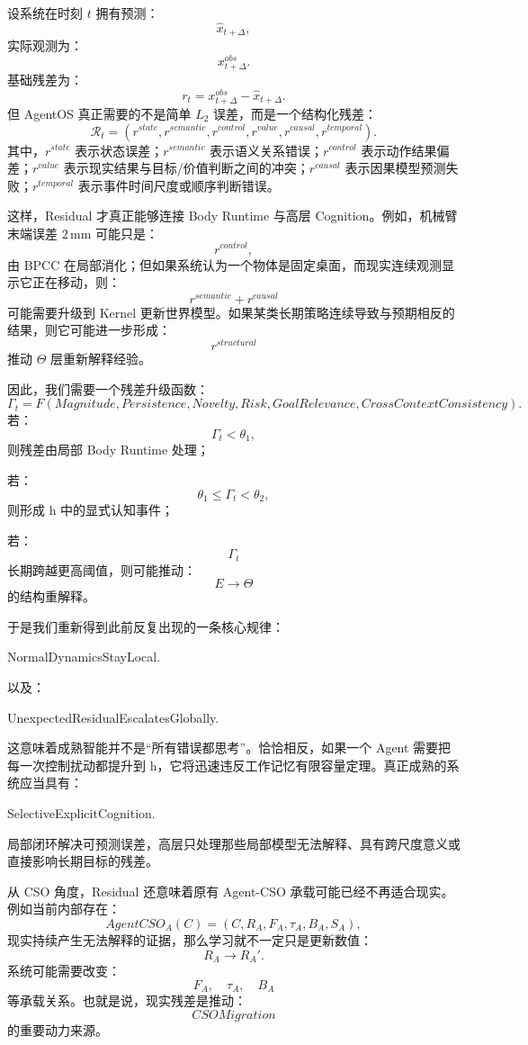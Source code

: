 设系统在时刻 $t$ 拥有预测：
\[
\hat{x}_{t+\Delta},
\]
实际观测为：
\[
x^{obs}_{t+\Delta}.
\]
基础残差为：
\[
r_t
=
x^{obs}_{t+\Delta}
-
\hat{x}_{t+\Delta}.
\]
但 AgentOS 真正需要的不是简单 $L_2$ 误差，而是一个结构化残差：
\[
\boxed{
\mathcal R_t
=
(
r^{state},
r^{semantic},
r^{control},
r^{value},
r^{causal},
r^{temporal}
).
}
\]
其中，$r^{state}$ 表示状态误差；$r^{semantic}$ 表示语义关系错误；$r^{control}$ 表示动作结果偏差；$r^{value}$ 表示现实结果与目标/价值判断之间的冲突；$r^{causal}$ 表示因果模型预测失败；$r^{temporal}$ 表示事件时间尺度或顺序判断错误。

这样，Residual 才真正能够连接 Body Runtime 与高层 Cognition。例如，机械臂末端误差 $2\,\mathrm{mm}$ 可能只是：
\[
r^{control},
\]
由 BPCC 在局部消化；但如果系统认为一个物体是固定桌面，而现实连续观测显示它正在移动，则：
\[
r^{semantic}+r^{causal}
\]
可能需要升级到 Kernel 更新世界模型。如果某类长期策略连续导致与预期相反的结果，则它可能进一步形成：
\[
r^{structural}
\]
推动 $\Theta$ 层重新解释经验。

因此，我们需要一个残差升级函数：
\[
\Gamma_t
=
F
\left(
Magnitude,
Persistence,
Novelty,
Risk,
GoalRelevance,
CrossContextConsistency
\right).
\]
若：
\[
\Gamma_t<\theta_1,
\]
则残差由局部 Body Runtime 处理；

若：
\[
\theta_1\leq\Gamma_t<\theta_2,
\]
则形成 h 中的显式认知事件；

若：
\[
\Gamma_t
\]
长期跨越更高阈值，则可能推动：
\[
E\rightarrow\Theta
\]
的结构重解释。

于是我们重新得到此前反复出现的一条核心规律：
\begin{statementbox}
NormalDynamicsStayLocal.
\end{statementbox}
以及：
\begin{statementbox}
UnexpectedResidualEscalatesGlobally.
\end{statementbox}

这意味着成熟智能并不是``所有错误都思考''。恰恰相反，如果一个 Agent 需要把每一次控制扰动都提升到 h，它将迅速违反工作记忆有限容量定理。真正成熟的系统应当具有：
\begin{statementbox}
SelectiveExplicitCognition.
\end{statementbox}
局部闭环解决可预测误差，高层只处理那些局部模型无法解释、具有跨尺度意义或直接影响长期目标的残差。

从 CSO 角度，Residual 还意味着原有 Agent-CSO 承载可能已经不再适合现实。例如当前内部存在：
\[
AgentCSO_A(C)
=
(C,R_A,F_A,\tau_A,B_A,S_A),
\]
现实持续产生无法解释的证据，那么学习就不一定只是更新数值：
\[
R_A\rightarrow R_A'.
\]
系统可能需要改变：
\[
F_A,\quad \tau_A,\quad B_A
\]
等承载关系。也就是说，现实残差是推动：
\[
CSOMigration
\]
的重要动力来源。

